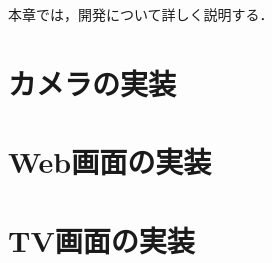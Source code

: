 \documentclass[../report]{subfiles}
\begin{document}
本章では，開発について詳しく説明する．


\section{カメラの実装}


\section{Web画面の実装}


\section{TV画面の実装}
\end{document}
